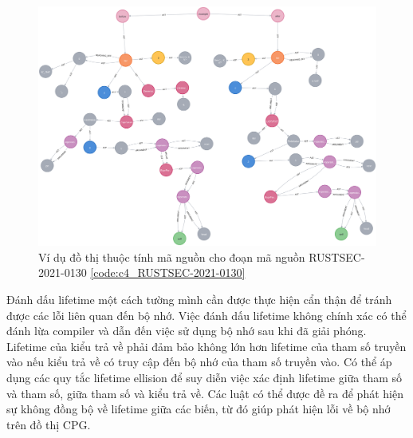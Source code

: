 \begin{figure}[H]
    \includegraphics[width=1\columnwidth]{figures/c4/c4_RUSTSEC-2021-0130.png}
    \centering
    \caption{Ví dụ đồ thị thuộc tính mã nguồn cho đoạn mã nguồn RUSTSEC-2021-0130 \ref{code:c4_RUSTSEC-2021-0130}}
    \label{img:c4_RUSTSEC-2021-0130}
\end{figure}

Đánh dấu lifetime một cách tường mình cần được thực hiện cẩn thận để tránh được các lỗi liên quan đến bộ nhớ. Việc đánh dấu lifetime không chính xác có thể đánh lừa compiler và dẫn đến việc sử dụng bộ nhớ sau khi đã giải phóng. Lifetime của kiểu trả về phải đảm bảo không lớn hơn lifetime của tham số truyền vào nếu kiểu trả về có truy cập đến bộ nhớ của tham số truyền vào. Có thể áp dụng các quy tắc lifetime ellision để suy diễn việc xác định lifetime giữa tham số và tham số, giữa tham số và kiểu trả về. Các luật có thể được đề ra để phát hiện sự không đồng bộ về lifetime giữa các biến, từ đó giúp phát hiện lỗi về bộ nhớ trên đồ thị CPG.
